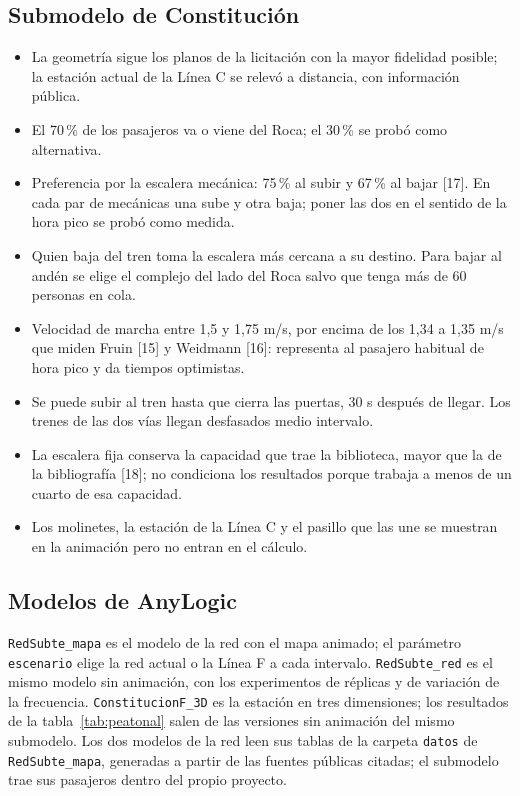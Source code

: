 \documentclass{article}
\begin{document}
\subsection*{Submodelo de Constitución}

\begin{itemize}
  \item La geometría sigue los planos de la licitación con la mayor fidelidad posible; la estación actual de
    la Línea C se relevó a distancia, con información pública.
  \item El 70\,\% de los pasajeros va o viene del Roca; el 30\,\% se probó como alternativa.
  \item Preferencia por la escalera mecánica: 75\,\% al subir y 67\,\% al bajar [17]. En cada par de mecánicas
    una sube y otra baja; poner las dos en el sentido de la hora pico se probó como medida.
  \item Quien baja del tren toma la escalera más cercana a su destino. Para bajar al andén se elige el
    complejo del lado del Roca salvo que tenga más de 60 personas en cola.
  \item Velocidad de marcha entre 1,5 y 1,75 m/s, por encima de los 1,34 a 1,35 m/s que miden Fruin [15] y
    Weidmann [16]: representa al pasajero habitual de hora pico y da tiempos optimistas.
  \item Se puede subir al tren hasta que cierra las puertas, 30 s después de llegar. Los trenes de las dos
    vías llegan desfasados medio intervalo.
  \item La escalera fija conserva la capacidad que trae la biblioteca, mayor que la de la bibliografía [18];
    no condiciona los resultados porque trabaja a menos de un cuarto de esa capacidad.
  \item Los molinetes, la estación de la Línea C y el pasillo que las une se muestran en la animación pero
    no entran en el cálculo.
\end{itemize}

\subsection*{Modelos de AnyLogic}

\texttt{RedSubte\_mapa} es el modelo de la red con el mapa animado; el parámetro \texttt{escenario} elige la
red actual o la Línea F a cada intervalo. \texttt{RedSubte\_red} es el mismo modelo sin animación, con los
experimentos de réplicas y de variación de la frecuencia. \texttt{ConstitucionF\_3D} es la estación en tres
dimensiones; los resultados de la tabla~\ref{tab:peatonal} salen de las versiones sin animación del mismo
submodelo. Los dos modelos de la red leen sus tablas de la carpeta \texttt{datos} de
\texttt{RedSubte\_mapa}, generadas a partir de las fuentes públicas citadas; el submodelo trae sus pasajeros
dentro del propio proyecto.
\end{document}
